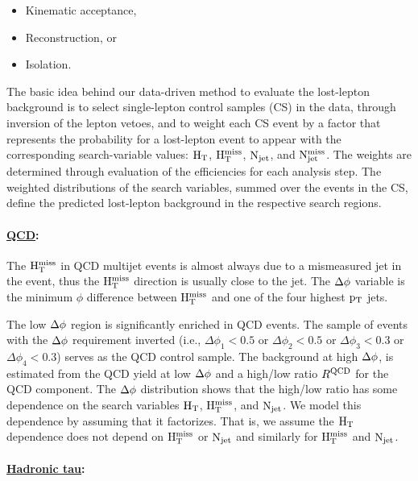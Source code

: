 \begin{itemize}
\item Kinematic acceptance,
\item Reconstruction, or
\item Isolation.
\end{itemize}
The basic idea behind our data-driven method to evaluate
the lost-lepton background is to select
single-lepton control samples (CS) in the data,
through inversion of the lepton vetoes,
and to weight each CS event
by a factor that represents the probability for a lost-lepton event
to appear with
the corresponding search-variable values: $\rm H_{T}$, $\rm H_{T}^{miss}$, $\rm N_{jet}$, and $\rm N_{jet}^{miss}$.
The weights are determined through evaluation of the efficiencies
for each analysis step.
The weighted distributions of the search variables,
summed over the events in the CS,
define the predicted lost-lepton background in the respective search regions.
\paragraph{\underline{QCD}: }
The $\rm H_{T}^{miss}$ in QCD multijet events is almost always due to a mismeasured jet in the event,
       thus the $\rm H_{T}^{miss}$ direction is usually close to the jet.
       The $\rm \Delta \phi$ variable is the minimum $\phi$ difference between $\rm H_{T}^{miss}$ and one of the four
       highest $\rm p_{T}$ jets.


       The low $\rm \Delta \phi$ region is significantly enriched in QCD events.
       The sample of events with the $\rm \Delta \phi$ requirement inverted
       (i.e., $\Delta \phi_1<0.5$ or $\Delta \phi_2<0.5$ or $\Delta \phi_3<0.3$ or $\Delta \phi_4<0.3$)
       serves as the QCD control sample.
       The background at high $\rm \Delta \phi$, is estimated from the QCD yield at low
       $\rm \Delta \phi$ and a high/low ratio $R^{\rm QCD}$ for the QCD component.
       The $\rm \Delta \phi$ distribution  shows that the high/low ratio
       has some dependence on the search variables $\rm H_{T}$, $\rm H_{T}^{miss}$, and $\rm N_{jet}$.
       We model this dependence by assuming that it factorizes.  That is, we assume the $\rm H_{T}$
       dependence does not depend on $\rm H_{T}^{miss}$ or $\rm N_{jet}$ and similarly for $\rm H_{T}^{miss}$ and $\rm N_{jet}$.
\paragraph{\underline{Hadronic tau}: }


